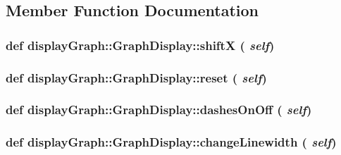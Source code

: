 \subsection{Member Function Documentation}
\hypertarget{classdisplayGraph_1_1GraphDisplay_4bd5ab8f7f95777dd9c9cb92178c9a6e}{
\subsubsection{\setlength{\rightskip}{0pt plus 5cm}def displayGraph::GraphDisplay::shiftX ( {\em self})}}
\label{classdisplayGraph_1_1GraphDisplay_4bd5ab8f7f95777dd9c9cb92178c9a6e}


\hypertarget{classdisplayGraph_1_1GraphDisplay_1a7e8d7110f4cdbc36e62a5c1e9920b0}{
\subsubsection{\setlength{\rightskip}{0pt plus 5cm}def displayGraph::GraphDisplay::reset ( {\em self})}}
\label{classdisplayGraph_1_1GraphDisplay_1a7e8d7110f4cdbc36e62a5c1e9920b0}


\hypertarget{classdisplayGraph_1_1GraphDisplay_4d2640c75cc429166b04a22ec5e70785}{
\subsubsection{\setlength{\rightskip}{0pt plus 5cm}def displayGraph::GraphDisplay::dashesOnOff ( {\em self})}}
\label{classdisplayGraph_1_1GraphDisplay_4d2640c75cc429166b04a22ec5e70785}


\hypertarget{classdisplayGraph_1_1GraphDisplay_004e09b1b5cff52ae7d40ab36314e57d}{
\subsubsection{\setlength{\rightskip}{0pt plus 5cm}def displayGraph::GraphDisplay::changeLinewidth ( {\em self})}}
\label{classdisplayGraph_1_1GraphDisplay_004e09b1b5cff52ae7d40ab36314e57d}


